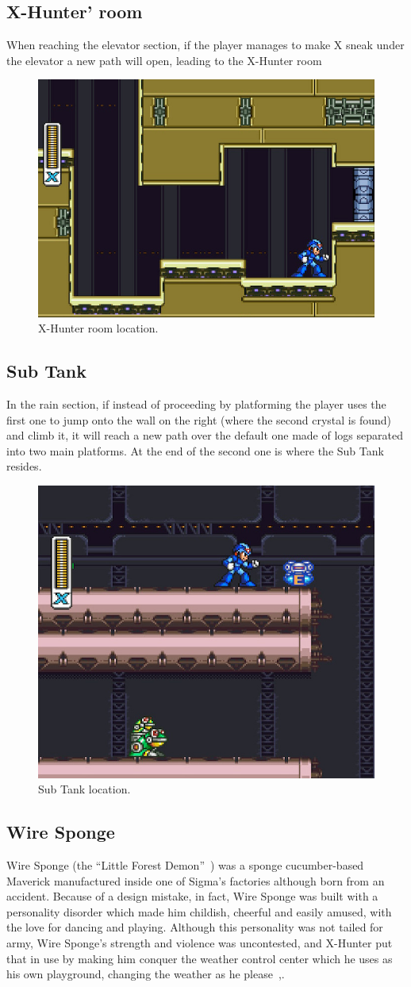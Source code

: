 \subsection{X-Hunter' room}
When reaching the elevator section, if the player manages to make X sneak under the elevator a new path will open, leading to the X-Hunter room
\begin{figure}[htp]
	\centering
	\includegraphics[width=0.5\linewidth]{figures/X2/Wire_sponge/Sponge_Hunter_room.jpg}
	\caption{X-Hunter room location.}
\end{figure}

\subsection{Sub Tank}
In the rain section, if instead of proceeding by platforming the player uses the first one to jump onto the wall on the right (where the second crystal is found) and climb it, it will reach a new path over the default one made of logs separated into two main platforms. At the end of the second one is where the Sub Tank resides.  
\begin{figure}[htp]
	\centering
	\includegraphics[width=0.5\linewidth]{figures/X2/Wire_sponge/Sponge_tank.jpg}
	\caption{Sub Tank location.}
\end{figure}

\subsection{Wire Sponge}\label{boss:Wire_sponge}
Wire Sponge (the ``Little Forest Demon''~\cite{book:MMX_Complete_art}) was a sponge cucumber-based Maverick manufactured inside one of Sigma's factories although born from an accident. Because of a design mistake, in fact, Wire Sponge was built with a personality disorder which made him childish, cheerful and easily amused, with the love for dancing and playing. Although this personality was not tailed for army, Wire Sponge's strength  and violence was uncontested, and X-Hunter put that in use by making him conquer the weather control center which he uses as his own playground, changing the weather as he please~\cite{wiki:wire_sponge},\cite{wayback:X2_resources}.

